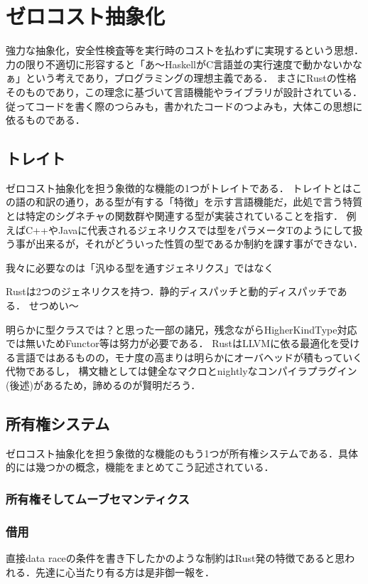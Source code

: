 \section{ゼロコスト抽象化}
強力な抽象化，安全性検査等を実行時のコストを払わずに実現するという思想．
力の限り不適切に形容すると「あ〜HaskellがC言語並の実行速度で動かないかなぁ」という考えであり，プログラミングの理想主義である．
まさにRustの性格そのものであり，この理念に基づいて言語機能やライブラリが設計されている．
従ってコードを書く際のつらみも，書かれたコードのつよみも，大体この思想に依るものである．

\subsection{トレイト}
ゼロコスト抽象化を担う象徴的な機能の1つがトレイトである．
トレイトとはこの語の和訳の通り，ある型が有する「特徴」を示す言語機能だ，此処で言う特質とは特定のシグネチャの関数群や関連する型が実装されていることを指す．
例えばC++やJavaに代表されるジェネリクスでは型をパラメータTのようにして扱う事が出来るが，それがどういった性質の型であるか制約を課す事ができない．

我々に必要なのは「汎ゆる型を通すジェネリクス」ではなく

Rustは2つのジェネリクスを持つ．静的ディスパッチと動的ディスパッチである．
せつめい〜

明らかに型クラスでは？と思った一部の諸兄，残念ながらHigherKindType対応では無いためFunctor等は努力が必要である．
RustはLLVMに依る最適化を受ける言語ではあるものの，モナ度の高まりは明らかにオーバヘッドが積もっていく代物であるし，
構文糖としては健全なマクロとnightlyなコンパイラプラグイン(後述)があるため，諦めるのが賢明だろう．

\subsection{所有権システム}
ゼロコスト抽象化を担う象徴的な機能のもう1つが所有権システムである．具体的には幾つかの概念，機能をまとめてこう記述されている．

\subsubsection{所有権そしてムーブセマンティクス}

\subsubsection{借用}
直接data raceの条件を書き下したかのような制約はRust発の特徴であると思われる．先達に心当たり有る方は是非御一報を．

